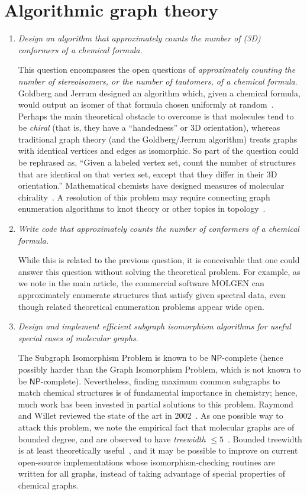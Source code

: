 \documentclass{sig-alternate}
\begin{document}
\section*{Algorithmic graph theory}
\begin{enumerate}
\item \emph{Design an algorithm that approximately counts the number of (3D) conformers of a chemical formula.}

This question encompasses the open questions of \emph{approximately counting the number of stereoisomers, or the number of tautomers, of a chemical formula}.  Goldberg and Jerrum designed an algorithm which, given a chemical formula, would output an isomer of that formula chosen uniformly at random~\cite{RandomlySampling}.  Perhaps the main theoretical obstacle to overcome is that molecules tend to be \emph{chiral} (that is, they have a ``handedness'' or 3D orientation), whereas traditional graph theory (and the Goldberg/Jerrum algorithm) treats graphs with identical vertices and edges as isomorphic.  So part of the question could be rephrased as, ``Given a labeled vertex set, count the number of structures that are identical on that vertex set, except that they differ in their 3D orientation.''  Mathematical chemists have designed measures of molecular chirality~\cite{ChiralityMeasures}. A resolution of this problem may require connecting graph enumeration algorithms to knot theory or other topics in topology~\cite{TopologicalLook}.
%
\item \emph{Write code that approximately counts the number of conformers of a chemical formula.}

While this is related to the previous question, it is conceivable that one could answer this question without solving the theoretical problem.  For example, as we note in the main article, the commercial software MOLGEN can approximately enumerate structures that satisfy given spectral data, even though related theoretical enumeration problems appear wide open.
%
\item \emph{Design and implement efficient subgraph isomorphism algorithms for useful special cases of molecular graphs}.

The Subgraph Isomorphism Problem is known to be $\textsf{NP}$-complete (hence possibly harder than the Graph Isomorphism Problem, which is not known to be $\textsf{NP}$-complete).  Nevertheless, finding maximum common subgraphs to match chemical structures is of fundamental importance in chemistry; hence, much work has been invested in partial solutions to this problem.  Raymond and Willet reviewed the state of the art in 2002~\cite{MCSreview}.  As one possible way to attack this problem, we note the empirical fact that molecular graphs are of bounded degree, and are observed to have \emph{treewidth} $\leq 5$~\cite{treewidth}.  Bounded treewidth is at least theoretically useful~\cite{Epp-JGAA-99}, and it may be possible to improve on current open-source implementations whose isomorphism-checking routines are written for all graphs, instead of taking advantage of special properties of chemical graphs.


\end{enumerate}
\end{document}
